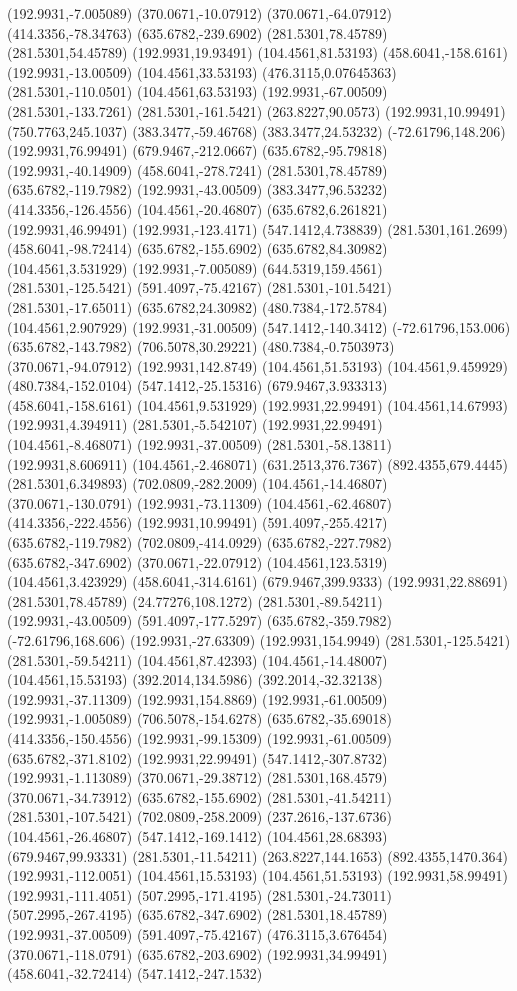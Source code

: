 \documentclass[12pt,letterpaper]{article}
\begin{document}
(192.9931,-7.005089) (370.0671,-10.07912) (370.0671,-64.07912) (414.3356,-78.34763) (635.6782,-239.6902) (281.5301,78.45789) (281.5301,54.45789) (192.9931,19.93491) (104.4561,81.53193) (458.6041,-158.6161) (192.9931,-13.00509) (104.4561,33.53193) (476.3115,0.07645363) (281.5301,-110.0501) (104.4561,63.53193) (192.9931,-67.00509) (281.5301,-133.7261) (281.5301,-161.5421) (263.8227,90.0573) (192.9931,10.99491) (750.7763,245.1037) (383.3477,-59.46768) (383.3477,24.53232) (-72.61796,148.206) (192.9931,76.99491) (679.9467,-212.0667) (635.6782,-95.79818) (192.9931,-40.14909) (458.6041,-278.7241) (281.5301,78.45789) (635.6782,-119.7982) (192.9931,-43.00509) (383.3477,96.53232) (414.3356,-126.4556) (104.4561,-20.46807) (635.6782,6.261821) (192.9931,46.99491) (192.9931,-123.4171) (547.1412,4.738839) (281.5301,161.2699) (458.6041,-98.72414) (635.6782,-155.6902) (635.6782,84.30982) (104.4561,3.531929) (192.9931,-7.005089) (644.5319,159.4561) (281.5301,-125.5421) (591.4097,-75.42167) (281.5301,-101.5421) (281.5301,-17.65011) (635.6782,24.30982) (480.7384,-172.5784) (104.4561,2.907929) (192.9931,-31.00509) (547.1412,-140.3412) (-72.61796,153.006) (635.6782,-143.7982) (706.5078,30.29221) (480.7384,-0.7503973) (370.0671,-94.07912) (192.9931,142.8749) (104.4561,51.53193) (104.4561,9.459929) (480.7384,-152.0104) (547.1412,-25.15316) (679.9467,3.933313) (458.6041,-158.6161) (104.4561,9.531929) (192.9931,22.99491) (104.4561,14.67993) (192.9931,4.394911) (281.5301,-5.542107) (192.9931,22.99491) (104.4561,-8.468071) (192.9931,-37.00509) (281.5301,-58.13811) (192.9931,8.606911) (104.4561,-2.468071) (631.2513,376.7367) (892.4355,679.4445) (281.5301,6.349893) (702.0809,-282.2009) (104.4561,-14.46807) (370.0671,-130.0791) (192.9931,-73.11309) (104.4561,-62.46807) (414.3356,-222.4556) (192.9931,10.99491) (591.4097,-255.4217) (635.6782,-119.7982) (702.0809,-414.0929) (635.6782,-227.7982) (635.6782,-347.6902) (370.0671,-22.07912) (104.4561,123.5319) (104.4561,3.423929) (458.6041,-314.6161) (679.9467,399.9333) (192.9931,22.88691) (281.5301,78.45789) (24.77276,108.1272) (281.5301,-89.54211) (192.9931,-43.00509) (591.4097,-177.5297) (635.6782,-359.7982) (-72.61796,168.606) (192.9931,-27.63309) (192.9931,154.9949) (281.5301,-125.5421) (281.5301,-59.54211) (104.4561,87.42393) (104.4561,-14.48007) (104.4561,15.53193) (392.2014,134.5986) (392.2014,-32.32138) (192.9931,-37.11309) (192.9931,154.8869) (192.9931,-61.00509) (192.9931,-1.005089) (706.5078,-154.6278) (635.6782,-35.69018) (414.3356,-150.4556) (192.9931,-99.15309) (192.9931,-61.00509) (635.6782,-371.8102) (192.9931,22.99491) (547.1412,-307.8732) (192.9931,-1.113089) (370.0671,-29.38712) (281.5301,168.4579) (370.0671,-34.73912) (635.6782,-155.6902) (281.5301,-41.54211) (281.5301,-107.5421) (702.0809,-258.2009) (237.2616,-137.6736) (104.4561,-26.46807) (547.1412,-169.1412) (104.4561,28.68393) (679.9467,99.93331) (281.5301,-11.54211) (263.8227,144.1653) (892.4355,1470.364) (192.9931,-112.0051) (104.4561,15.53193) (104.4561,51.53193) (192.9931,58.99491) (192.9931,-111.4051) (507.2995,-171.4195) (281.5301,-24.73011) (507.2995,-267.4195) (635.6782,-347.6902) (281.5301,18.45789) (192.9931,-37.00509) (591.4097,-75.42167) (476.3115,3.676454) (370.0671,-118.0791) (635.6782,-203.6902) (192.9931,34.99491) (458.6041,-32.72414) (547.1412,-247.1532) 
\end{document}
